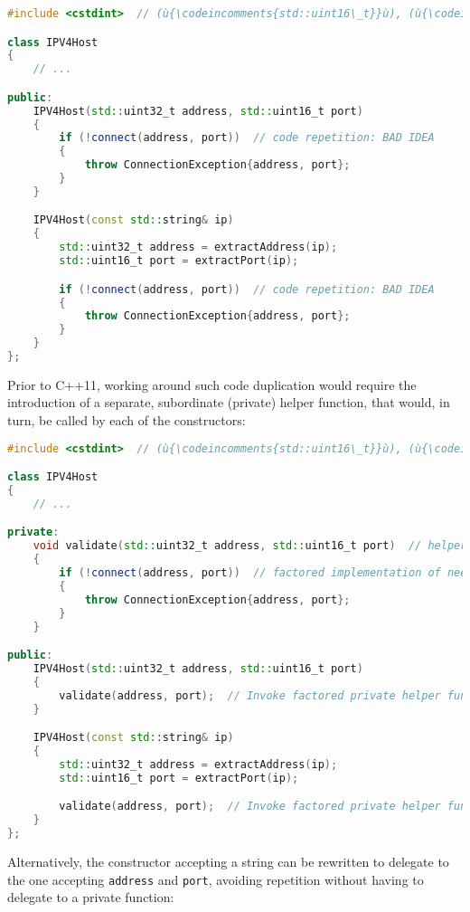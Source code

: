 \begin{lstlisting}[language=C++]
#include <cstdint>  // (ù{\codeincomments{std::uint16\_t}}ù), (ù{\codeincomments{std::uint32\_t}}ù)

class IPV4Host
{
    // ...

public:
    IPV4Host(std::uint32_t address, std::uint16_t port)
    {
        if (!connect(address, port))  // code repetition: BAD IDEA
        {
            throw ConnectionException{address, port};
        }
    }

    IPV4Host(const std::string& ip)
    {
        std::uint32_t address = extractAddress(ip);
        std::uint16_t port = extractPort(ip);

        if (!connect(address, port))  // code repetition: BAD IDEA
        {
            throw ConnectionException{address, port};
        }
    }
};
\end{lstlisting}
    
\noindent Prior to C++11, working around such code duplication would require the
introduction of a separate, subordinate (private) helper function, that
would, in turn, be called by each of the constructors:

\begin{lstlisting}[language=C++]
#include <cstdint>  // (ù{\codeincomments{std::uint16\_t}}ù), (ù{\codeincomments{std::uint32\_t}}ù)

class IPV4Host
{
    // ...

private:
    void validate(std::uint32_t address, std::uint16_t port)  // helper function
    {
        if (!connect(address, port))  // factored implementation of needed logic
        {
            throw ConnectionException{address, port};
        }
    }

public:
    IPV4Host(std::uint32_t address, std::uint16_t port)
    {
        validate(address, port);  // Invoke factored private helper function.
    }

    IPV4Host(const std::string& ip)
    {
        std::uint32_t address = extractAddress(ip);
        std::uint16_t port = extractPort(ip);

        validate(address, port);  // Invoke factored private helper function.
    }
};
\end{lstlisting}
    
\noindent Alternatively, the constructor accepting a string can be rewritten to
delegate to the one accepting \texttt{address} and \texttt{port},
avoiding repetition without having to delegate to a private function:

